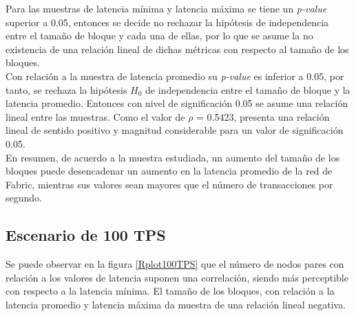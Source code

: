 \begin{table}[h]
\centering
{}
\caption{Resultados de aplicar el \emph{coeficiente de correlaci\'on de Spearman} entre el tama\~no de los bloques y las muestras de latencia en redes con un flujo de 10 TPS.}
\label{tab:CorrelacionTamBloques10TPS}
\end{table}

Para las muestras de latencia m\'inima y latencia m\'axima se tiene un \emph{p-value} superior a 0.05, entonces se decide no rechazar la hip\'otesis de independencia entre el tama\~no de bloque y cada una de ellas, por lo que se asume la no existencia de una relaci\'on lineal de dichas m\'etricas con respecto al tama\~no de los bloques.\\

Con relaci\'on a la muestra de latencia promedio su \emph{p-value} es inferior a 0.05, por tanto, se rechaza la hip\'otesis $H_0$ de independencia entre el tama\~no de bloque y la latencia promedio. Entonces con nivel de significaci\'on 0.05 se asume una relaci\'on lineal entre las muestras. Como el valor de $\rho$ = 0.5423, presenta una relaci\'on lineal de sentido positivo y magnitud considerable para un valor de significaci\'on 0.05.\\ 

En resumen, de acuerdo a la muestra estudiada, un aumento del tama\~no de los bloques puede desencadenar un aumento en la latencia promedio de la red de Fabric, mientras sus valores sean mayores que el n\'umero de transacciones por segundo.\\



\newpage
\subsection{Escenario de 100 TPS}
Se puede observar en la figura \ref{Rplot100TPS} que el n\'umero de nodos pares con relaci\'on a los valores de latencia suponen una correlaci\'on, siendo m\'as perceptible con respecto a la latencia m\'inima. El tama\~no de los bloques, con relaci\'on a la latencia promedio y latencia m\'axima da muestra de una relaci\'on lineal negativa.\\

